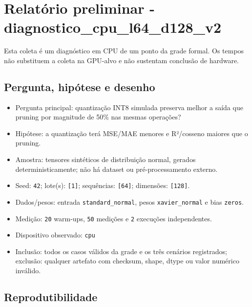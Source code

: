 

\chapter{Relatório preliminar - diagnostico\_\allowbreak{}cpu\_\allowbreak{}l64\_\allowbreak{}d128\_\allowbreak{}v2}



\begin{icquote}
Esta coleta é um diagnóstico em CPU de um ponto da grade formal. Os tempos não substituem a coleta na GPU-alvo e não sustentam conclusão de hardware.
\end{icquote}



\section{Pergunta, hipótese e desenho}


\begin{itemize}
\item Pergunta principal: quantização INT8 simulada preserva melhor a saída que pruning por magnitude de 50\% nas mesmas operações?
\item Hipótese: a quantização terá MSE/MAE menores e R²/cosseno maiores que o pruning.
\item Amostra: tensores sintéticos de distribuição normal, gerados deterministicamente; não há dataset ou pré-processamento externo.
\item Seed: \texttt{42}; lote(s): \texttt{[1]}; sequências: \texttt{[64]}; dimensões: \texttt{[128]}.
\item Dados/pesos: entrada \texttt{standard\_\allowbreak{}normal}, pesos \texttt{xavier\_\allowbreak{}normal} e bias \texttt{zeros}.
\item Medição: \texttt{20} warm-ups, \texttt{50} medições e \texttt{2} execuções independentes.
\item Dispositivo observado: \texttt{cpu}
\item Inclusão: todos os casos válidos da grade e os três cenários registrados; exclusão: qualquer artefato com checksum, shape, dtype ou valor numérico inválido.
\end{itemize}


\section{Reprodutibilidade}


